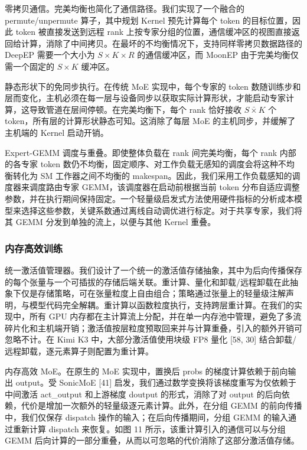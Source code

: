 \documentclass[
  10
]{article}
\begin{document}
零拷贝通信。完美均衡也简化了通信路径。我们实现了一个融合的 permute/unpermute 算子，其中规划 Kernel 预先计算每个 token 的目标位置，因此 token 被直接发送到远程 rank 上按专家分组的位置，通信缓冲区的视图直接返回给计算，消除了中间拷贝。在最坏的不均衡情况下，支持同样零拷贝数据路径的 DeepEP 需要一个大小为 \(S \times K \times R\) 的通信缓冲区，而 MoonEP 由于完美均衡仅需一个固定的 \(S \times K\) 缓冲区。

静态形状下的免同步执行。在传统 MoE 实现中，每个专家的 token 数随训练步和层而变化，主机必须在每一层与设备同步以获取实际计算形状，才能启动专家计算，这导致管道在层间停顿。在完美均衡下，每个 rank 恰好接收 \(S \bar { \times } K\) 个 token，所有层的计算形状静态可知。这消除了每层 MoE 的主机同步，并缓解了主机端的 Kernel 启动开销。

Expert-GEMM 调度与重叠。即使整体负载在 rank 间完美均衡，每个 rank 内部的各专家 token 数仍不均衡，固定顺序、对工作负载无感知的调度会将这种不均衡转化为 SM 工作器之间不均衡的 makespan。因此，我们采用工作负载感知的调度器来调度路由专家 GEMM，该调度器在启动前根据当前 token 分布自适应调整参数，并在执行期间保持固定。一个轻量级启发式方法使用硬件指标的分析成本模型来选择这些参数，关键系数通过离线自动调优进行标定。对于共享专家，我们将其 GEMM 分发到单独的流上，以便与其他 Kernel 重叠。

\subsubsection{内存高效训练}\label{memory-efficient-training}

统一激活值管理器。我们设计了一个统一的激活值存储抽象，其中为后向传播保存的每个张量与一个可插拔的存储后端关联。重计算、量化和卸载/远程卸载在此抽象下仅是存储策略，可在张量粒度上自由组合；策略通过张量上的轻量级注解声明，与模型代码完全解耦。重计算以函数粒度执行，支持跨层重计算。在我们的实现中，所有 GPU 内存都在主计算流上分配，并在单一内存池中管理，避免了多流碎片化和主机端开销；激活值按层粒度预取回来并与计算重叠，引入的额外开销可忽略不计。在 Kimi K3 中，大部分激活值使用块级 FP8 量化 {[}58, 30{]} 结合卸载/远程卸载，逐元素算子则配置为重计算。

内存高效 MoE。在原生的 MoE 实现中，置换后 probs 的梯度计算依赖于前向输出 output。受 SonicMoE {[}41{]} 启发，我们通过数学变换将该梯度重写为仅依赖于中间激活 act\_output 和上游梯度 doutput 的形式，消除了对 output 的后向依赖，代价是增加一次额外的轻量级逐元素计算。此外，在分组 GEMM 的前向传播中，我们仅保存 dispatch 操作的输入；在后向传播期间，分组 GEMM 的输入通过重新计算 dispatch 来恢复。如图 11 所示，该重计算引入的通信可以与分组 GEMM 后向计算的一部分重叠，从而以可忽略的代价消除了这部分激活值存储。
\end{document}
